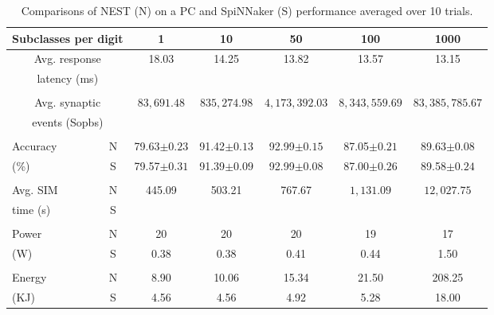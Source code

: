 \begin{table} 
	\caption{Comparisons of NEST (N) on a PC and SpiNNaker (S) performance averaged over 10 trials.}
	\begin{center}
		\bgroup
		\def\arraystretch{1.4}
		\begin{tabular} {l| c  c c c c c}
			\multicolumn{2}{c}{Subclasses per digit} 
			& 1 & 10 & 50 & 100 & 1000 \\
			\hline
			\multicolumn{2}{c}{Avg. response}
			& \multirow{2}{*}{18.03} & \multirow{2}{*}{14.25} & \multirow{2}{*}{13.82} & \multirow{2}{*}{13.57} & \multirow{2}{*}{13.15} \\
			\multicolumn{2}{c}{latency (ms)}
			& & & & &
			\\
			\multicolumn{7}{c}{\vspace*{-3mm}}\\
			\multicolumn{2}{c}{Avg. synaptic}
			& \multirow{2}{*}{$83,691.48$}
			& \multirow{2}{*}{$835,274.98$}
			& \multirow{2}{*}{$4,173,392.03$}
			& \multirow{2}{*}{$8,343,559.69$}
			& \multirow{2}{*}{$83,385,785.67$}
			\\	
			\multicolumn{2}{c}{events (Sopbs)}
			& & & & &
			\\
			\multicolumn{7}{c}{\vspace*{-3mm}}\\
			Accuracy
			& N 
			& 79.63$\pm0.23$
			& 91.42$\pm0.13$ 
			& 92.99$\pm0.15$
			& 87.05$\pm0.21$
			& 89.63$\pm0.08$
			\\
			(\%)
			& S
			& 79.57$\pm0.31$
			& 91.39$\pm0.09$
			& 92.99$\pm0.08$
			& 87.00$\pm0.26$
			& 89.58$\pm0.24$
			\\
			& &\multicolumn{5}{c}{\vspace*{-4mm}}\\
			Avg. SIM
			& N 
			& 445.09
			& 503.21
			& 767.67
			& $1,131.09$
			& $12,027.75$
			\\
			time (s)
			& S
			& \protect\TLSdel{\multicolumn{5}{c}{$12,000$}} \protect\TLSins{\multicolumn{5}{c}{12K}}
			\\
			& &\multicolumn{5}{c}{\vspace*{-4mm}}\\
			Power
			& N 
			& 20
			& 20
			& 20
			& 19
			& 17
			\\
			(W) & S
			& 0.38 
			& 0.38 
			& 0.41
			& 0.44
			& 1.50
			\\
			& &\multicolumn{5}{c}{\vspace*{-4mm}}\\
			Energy
			& N 
			& 8.90
			& 10.06
			& 15.34
			& 21.50
			& 208.25
			\\
			(KJ) & S
			& 4.56
			& 4.56
			& 4.92
			& 5.28
			& 18.00
			\\
		\end{tabular}
		\egroup
		\label{tbl:compare}
	\end{center}
\end{table}

